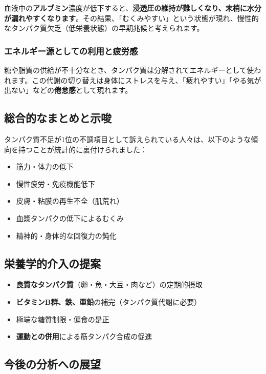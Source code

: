 \documentclass[a4paper,12pt]{article}
\begin{document}
血液中の\textbf{アルブミン}濃度が低下すると、\textbf{浸透圧の維持が難しくなり、末梢に水分が漏れやすくなります}。その結果、「むくみやすい」という状態が現れ、慢性的なタンパク質欠乏（低栄養状態）の早期兆候と考えられます。

\subsubsection*{エネルギー源としての利用と疲労感}

糖や脂質の供給が不十分なとき、タンパク質は分解されてエネルギーとして使われます。この代謝の切り替えは身体にストレスを与え、「疲れやすい」「やる気が出ない」などの\textbf{倦怠感}として現れます。

\subsection*{総合的なまとめと示唆}

タンパク質不足が1位の不調項目として訴えられている人々は、以下のような傾向を持つことが統計的に裏付けられました：

\begin{itemize}
  \item 筋力・体力の低下
  \item 慢性疲労・免疫機能低下
  \item 皮膚・粘膜の再生不全（肌荒れ）
  \item 血漿タンパクの低下によるむくみ
  \item 精神的・身体的な回復力の鈍化
\end{itemize}

\subsection*{栄養学的介入の提案}

\begin{itemize}
  \item \textbf{良質なタンパク質}（卵・魚・大豆・肉など）の定期的摂取
  \item \textbf{ビタミンB群、鉄、亜鉛}の補完（タンパク質代謝に必要）
  \item 極端な糖質制限・偏食の是正
  \item \textbf{運動との併用}による筋タンパク合成の促進
\end{itemize}

\subsection*{今後の分析への展望}
\end{document}
